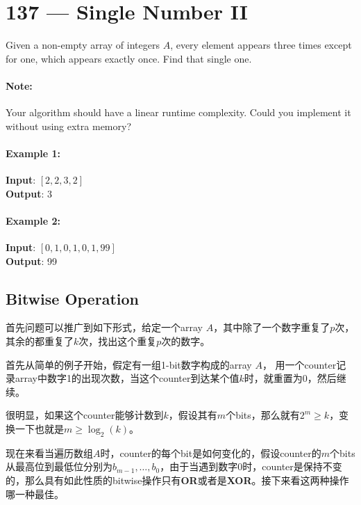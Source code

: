 \section{137 --- Single Number II}
Given a non-empty array of integers $A$, every element appears three times except for one, which appears exactly once. Find that single one.
\paragraph{Note:}
\begin{flushleft}
Your algorithm should have a linear runtime complexity. Could you implement it without using extra memory?
\end{flushleft}
\paragraph{Example 1:}
\begin{flushleft}
\textbf{Input}: $[2,2,3,2]$
\\
\textbf{Output}: 3
\end{flushleft}
\paragraph{Example 2:}
\begin{flushleft}
\textbf{Input}: $[0,1,0,1,0,1,99]$
\\
\textbf{Output}: 99
\end{flushleft}
\subsection{Bitwise Operation}
首先问题可以推广到如下形式，给定一个array $A$，其中除了一个数字重复了$p$次，其余的都重复了$k$次，找出这个重复$p$次的数字。

首先从简单的例子开始，假定有一组1-bit数字构成的array $A$， 用一个counter记录array中数字1的出现次数，当这个counter到达某个值$k$时，就重置为0，然后继续。

很明显，如果这个counter能够计数到$k$，假设其有$m$个bits，那么就有$2^m\geq k$，变换一下也就是$m\geq \log_{2}(k)$。

现在来看当遍历数组$A$时，counter的每个bit是如何变化的，假设counter的$m$个bits从最高位到最低位分别为$b_{m-1}, \ldots, b_0$，由于当遇到数字0时，counter是保持不变的，那么具有如此性质的bitwise操作只有\textbf{OR}或者是\textbf{XOR}。接下来看这两种操作哪一种最佳。

